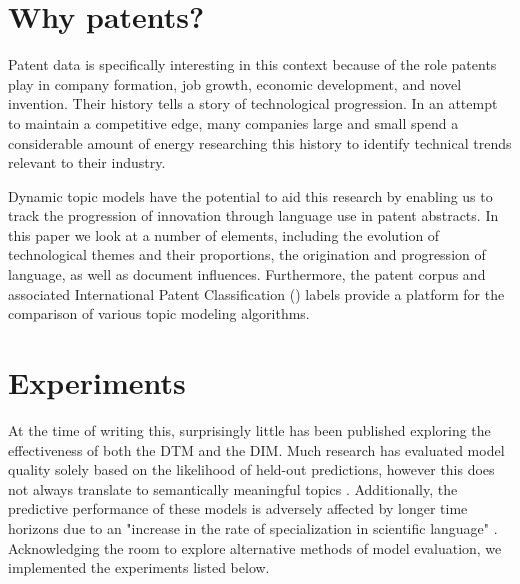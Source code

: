 \section{Why patents?}
Patent data is specifically interesting in this context because of the role patents play in company formation, job growth, economic development, and novel invention. Their history tells a story of technological progression. In an attempt to maintain a competitive edge, many companies large and small spend a considerable amount of energy researching this history to identify technical trends relevant to their industry. 

Dynamic topic models have the potential to aid this research by enabling us to track the progression of innovation through language use in patent abstracts. In this paper we look at a number of elements, including the evolution of technological themes and their proportions, the origination and progression of language, as well as document influences. Furthermore, the patent corpus and associated International Patent Classification () labels provide a platform for the comparison of various topic modeling algorithms.


\section{Experiments}

At the time of writing this, surprisingly little has been published exploring the effectiveness of both the DTM and the DIM. Much research has evaluated model quality solely based on the likelihood of held-out predictions, however this does not always translate to semantically meaningful topics \parencite{Chang:Boyd-Graber:Wang:Gerrish:Blei-2009}. Additionally, the predictive performance of these models is adversely affected by longer time horizons due to an "increase in the rate of specialization in scientific language" \parencite{Blei:2006:DTM:1143844.1143859}. Acknowledging the room to explore alternative methods of model evaluation, we implemented the experiments listed below. 

